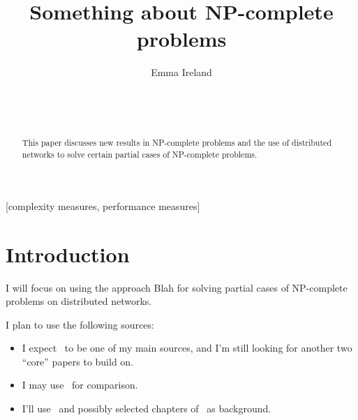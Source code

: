 \documentclass{sig-alternate}
\begin{document}

\title{Something about NP-complete problems}


\author{
\alignauthor
Emma Ireland\\
	\\
	\\
	\\
}

\maketitle

\begin{abstract}
This paper discusses new results in NP-complete problems and the use of distributed
networks to solve certain partial cases of NP-complete problems.
\end{abstract}

[complexity measures, performance measures]



\section{Introduction}
I will focus on using the approach Blah for solving partial cases of
NP-complete problems on distributed networks.

I plan to use the following sources:
\begin{itemize}
\item I expect~\cite{OM:2008} to be one of my main sources, and I'm still looking for another two ``core'' papers to build on.
\item I may use~\cite{Brun:2008} for comparison. 
\item I'll use~\cite{Aaronson:2005, wiki:np-complete} and possibly selected chapters of~\cite{Garey:1979} as background. 
\end{itemize}
\end{document}
